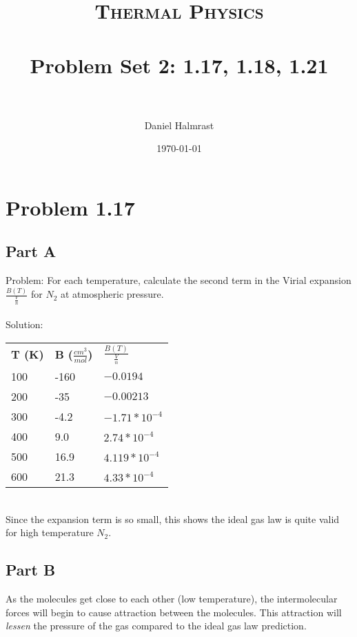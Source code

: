 \documentclass[paper=a4, fontsize=11pt]{scrartcl} %
\title{	
\normalfont \normalsize 
\textsc{Thermal Physics} \\ [25pt] %
\horrule{0.5pt} \\[0.4cm] %
\huge Problem Set 2: 1.17, 1.18, 1.21 \\ %
\horrule{2pt} \\[0.5cm] %
}
\author{Daniel Halmrast} %
\date{\normalsize\today} %
\numberwithin{equation}{section} %
\numberwithin{figure}{section} %
\numberwithin{table}{section} %
\begin{document}
\maketitle %


\section*{Problem 1.17}
\subsection*{Part A}
Problem: For each temperature, calculate the second term in the Virial expansion
$\frac{B(T)}{\frac{V}{n}}$ for $N_2$ at atmospheric pressure.
\\
\\
Solution:
\\
\begin{tabular}{l | l | l}
\textbf{T (K)}  & \textbf{B ($\frac{cm^3}{mol}$)} & \textbf{$\frac{B(T)}{\frac{V}{n}}$}\\
100             & -160          & $-0.0194$\\
200             & -35           & $-0.00213$\\
300             & -4.2          & $-1.71*10^{-4}$\\
400             & 9.0           & $2.74*10^{-4}$\\
500             & 16.9          & $4.119*10^{-4}$\\
600             & 21.3          & $4.33*10^{-4}$
\end{tabular}
\\
Since the expansion term is so small, this shows the ideal gas law is quite valid for high
temperature $N_2$.

\subsection*{Part B}
As the molecules get close to each other (low temperature), the intermolecular forces will
begin to cause attraction between the molecules. This attraction will \emph{lessen} the
pressure of the gas compared to the ideal gas law prediction.
\end{document}

